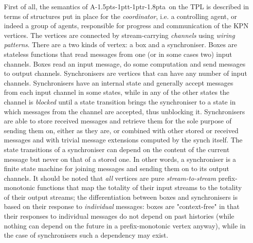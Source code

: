 \documentclass[11pt]{report}
\def\ak{{\textsf{A\kern-1.5pts\kern-1ptt\kern-1ptr\kern-1.8pta}}\kern-2pt{\it K\kern-2ptahn}}
\begin{document}
First of all, the semantics of \ak\ on the TPL is described in terms of structures put in place for the {\em coordinator}, i.e. a controlling
agent, or indeed a group of agents, responsible for progress and communication of the KPN vertices. The vertices are
connected by stream-carrying {\em channels}  using {\em wiring patterns}. There are a two kinds of vertex: a box and a synchroniser. Boxes
are stateless functions that  read messages from one (or in some cases two)  input channels. Boxes read an input message, do some computation
and send messages to output channels. Synchronisers are vertices that can have any number of input channels. Synchronisers
have an internal state and generally accept messages from each input channel in some states, while in any of the other states
the channel is {\em blocked} until a state transition brings the synchroniser to a state in which messages from the
channel are accepted, thus unblocking it. Synchronisers are able to store received messages and retrieve them for the sole purpose
of sending them on, either as they are, or combined with other stored or received messages and with trivial message extensions
computed by the synch itself. The state transitions of a synchroniser can depend on the content of the current message but never on
that of a stored one. In other words, a synchroniser is a finite state machine for joining
messages and sending them on to its output channels. It should be noted that {\em all} vertices
are pure {\em stream-to-stream} prefix-monotonic functions that map the totality of their input streams
to the totality of their output streams; the differentiation between boxes and synchronisers is based on their response to {\em individual}
messages: boxes are "context-free" in that their responses to individual messages do not depend on past histories (while nothing
can depend on the future in a prefix-monotonic vertex anyway), while in the case of synchronisers such a dependency may exist.
\end{document}
